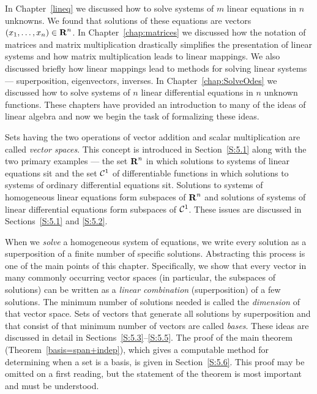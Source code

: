 \label{C:vectorspaces}

\normalsize

In Chapter~\ref{lineq} we discussed how to solve systems of $m$
linear equations in $n$ unknowns.  We found that solutions of
these equations are vectors $(x_1,\ldots,x_n)\in\mbox{$\bf{R}$}^n$.  
In Chapter~\ref{chap:matrices} we discussed how the notation of
matrices and matrix multiplication drastically simplifies the
presentation of linear systems and how matrix multiplication
leads to linear mappings.  We also discussed briefly how linear
mappings lead to methods for solving linear systems ---
superposition, eigenvectors, inverses.  In
Chapter~\ref{chap:SolveOdes} we discussed how to solve systems
of $n$ linear differential equations in $n$ unknown functions.
These chapters have
provided an introduction to many of the ideas of linear algebra
and now we begin the task of formalizing these ideas.

Sets having the two operations of vector addition and scalar
multiplication are called {\em vector spaces\/}.  This concept
is introduced in Section~\ref{S:5.1} along with the two
primary examples --- the set $\mbox{$\bf{R}$}^n$ in which solutions to systems
of linear equations sit and the set ${\cal C}^1$ of differentiable
functions in which solutions to systems of ordinary differential
equations sit.  Solutions to systems of homogeneous linear equations
form subspaces of $\mbox{$\bf{R}$}^n$ and solutions of systems of linear
differential equations form subspaces of ${\cal C}^1$.  These issues
are discussed in Sections~\ref{S:5.1} and \ref{S:5.2}.

When we {\em solve\/} a homogeneous system of equations, we write
every solution as a superposition of a finite number of specific
solutions.  Abstracting this process is one of the main points of this
chapter.  Specifically, we show that every vector in many commonly
occurring vector spaces
(in particular, the subspaces of solutions) can be written as a
{\em linear combination\/} (superposition) of a few 
solutions.  The minimum number of solutions needed is called
the {\em dimension\/} of that vector space.  Sets of vectors that 
generate all solutions by superposition and that consist of that minimum 
number of vectors are called {\em bases\/}.  These ideas are discussed
in detail in Sections~\ref{S:5.3}--\ref{S:5.5}.  The proof of
the main theorem (Theorem~\ref{basis=span+indep}), which gives a
computable method for determining when a set is a basis, is given in
Section~\ref{S:5.6}.  This proof may be omitted on a first reading,
but the statement of the theorem is most important and must be
understood.


